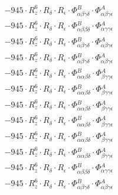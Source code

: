 \documentclass{article}
\begin{document}
\begin{subequations}
\begin{gather}
\begin{array}{c}
 \\[0.2em] 		 - 945 \cdot R_{z}^{6} \cdot R_{\delta{}} \cdot R_{\epsilon{}} \cdot \Phi{}^{B}_{\alpha{}\beta{}\gamma{}\delta{}} \cdot \Phi{}^{A}_{\alpha{}\beta{}\gamma{}\epsilon{}} 
 \\[0.2em] 		 - 945 \cdot R_{z}^{6} \cdot R_{\delta{}} \cdot R_{\epsilon{}} \cdot \Phi{}^{B}_{\alpha{}\beta{}\beta{}\delta{}} \cdot \Phi{}^{A}_{\alpha{}\gamma{}\gamma{}\epsilon{}} 
 \\[0.2em] 		 - 945 \cdot R_{z}^{6} \cdot R_{\delta{}} \cdot R_{\epsilon{}} \cdot \Phi{}^{B}_{\alpha{}\beta{}\gamma{}\delta{}} \cdot \Phi{}^{A}_{\alpha{}\beta{}\gamma{}\epsilon{}} 
 \\[0.2em] 		 - 945 \cdot R_{z}^{6} \cdot R_{\delta{}} \cdot R_{\epsilon{}} \cdot \Phi{}^{B}_{\alpha{}\beta{}\gamma{}\delta{}} \cdot \Phi{}^{A}_{\alpha{}\beta{}\gamma{}\epsilon{}} 
 \\[0.2em] 		 - 945 \cdot R_{z}^{6} \cdot R_{\delta{}} \cdot R_{\epsilon{}} \cdot \Phi{}^{B}_{\alpha{}\alpha{}\beta{}\delta{}} \cdot \Phi{}^{A}_{\beta{}\gamma{}\gamma{}\epsilon{}} 
 \\[0.2em] 		 - 945 \cdot R_{z}^{6} \cdot R_{\delta{}} \cdot R_{\epsilon{}} \cdot \Phi{}^{B}_{\alpha{}\alpha{}\beta{}\delta{}} \cdot \Phi{}^{A}_{\beta{}\gamma{}\gamma{}\epsilon{}} 
 \\[0.2em] 		 - 945 \cdot R_{z}^{6} \cdot R_{\delta{}} \cdot R_{\epsilon{}} \cdot \Phi{}^{B}_{\alpha{}\alpha{}\beta{}\delta{}} \cdot \Phi{}^{A}_{\beta{}\gamma{}\gamma{}\epsilon{}} 
 \\[0.2em] 		 - 945 \cdot R_{z}^{6} \cdot R_{\delta{}} \cdot R_{\epsilon{}} \cdot \Phi{}^{B}_{\alpha{}\alpha{}\beta{}\delta{}} \cdot \Phi{}^{A}_{\beta{}\gamma{}\gamma{}\epsilon{}} 
 \\[0.2em] 		 - 945 \cdot R_{z}^{6} \cdot R_{\delta{}} \cdot R_{\epsilon{}} \cdot \Phi{}^{B}_{\alpha{}\alpha{}\beta{}\delta{}} \cdot \Phi{}^{A}_{\beta{}\gamma{}\gamma{}\epsilon{}} 
 \\[0.2em] 		 - 945 \cdot R_{z}^{6} \cdot R_{\delta{}} \cdot R_{\epsilon{}} \cdot \Phi{}^{B}_{\alpha{}\alpha{}\beta{}\delta{}} \cdot \Phi{}^{A}_{\beta{}\gamma{}\gamma{}\epsilon{}} 
 \\[0.2em] 		 - 945 \cdot R_{z}^{6} \cdot R_{\delta{}} \cdot R_{\epsilon{}} \cdot \Phi{}^{B}_{\alpha{}\beta{}\beta{}\delta{}} \cdot \Phi{}^{A}_{\alpha{}\gamma{}\gamma{}\epsilon{}} 
 \\[0.2em] 		 - 945 \cdot R_{z}^{6} \cdot R_{\delta{}} \cdot R_{\epsilon{}} \cdot \Phi{}^{B}_{\alpha{}\beta{}\gamma{}\delta{}} \cdot \Phi{}^{A}_{\alpha{}\beta{}\gamma{}\epsilon{}} 

\end{array}
\end{gather}
\end{subequations}
\end{document}
